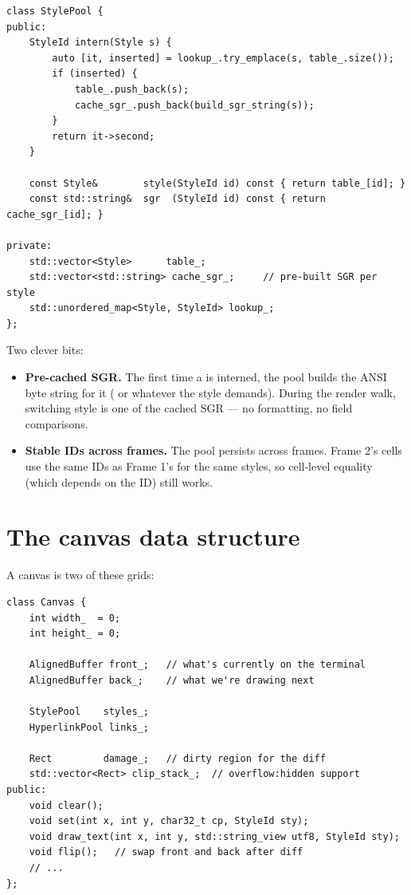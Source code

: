 \begin{lstlisting}
class StylePool {
public:
    StyleId intern(Style s) {
        auto [it, inserted] = lookup_.try_emplace(s, table_.size());
        if (inserted) {
            table_.push_back(s);
            cache_sgr_.push_back(build_sgr_string(s));
        }
        return it->second;
    }

    const Style&        style(StyleId id) const { return table_[id]; }
    const std::string&  sgr  (StyleId id) const { return cache_sgr_[id]; }

private:
    std::vector<Style>      table_;
    std::vector<std::string> cache_sgr_;     // pre-built SGR per style
    std::unordered_map<Style, StyleId> lookup_;
};
\end{lstlisting}

Two clever bits:

\begin{itemize}[leftmargin=*]
  \item \textbf{Pre-cached SGR.} The first time a  is
    interned, the pool builds the ANSI byte string for it
    (\code{ESC[1;38;2;100;180;255m} or whatever the style demands).
    During the render walk, switching style is one  of
    the cached SGR --- no formatting, no field comparisons.
  \item \textbf{Stable IDs across frames.} The pool persists across
    frames. Frame 2's cells use the same IDs as Frame 1's for the
    same styles, so cell-level equality (which depends on the ID)
    still works.
\end{itemize}

\section{The canvas data structure}

A canvas is two of these grids:

\begin{lstlisting}
class Canvas {
    int width_  = 0;
    int height_ = 0;

    AlignedBuffer front_;   // what's currently on the terminal
    AlignedBuffer back_;    // what we're drawing next

    StylePool    styles_;
    HyperlinkPool links_;

    Rect         damage_;   // dirty region for the diff
    std::vector<Rect> clip_stack_;  // overflow:hidden support
public:
    void clear();
    void set(int x, int y, char32_t cp, StyleId sty);
    void draw_text(int x, int y, std::string_view utf8, StyleId sty);
    void flip();   // swap front and back after diff
    // ...
};
\end{lstlisting}

